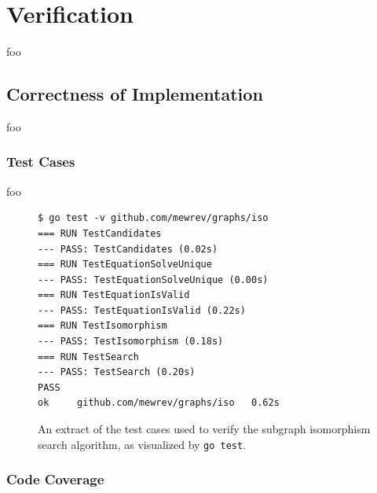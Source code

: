 
\section{Verification}


foo


\subsection{Correctness of Implementation}

foo

\subsubsection{Test Cases}


foo

\begin{figure}[htbp]
	\begin{center}
		\begin{verbatim}
$ go test -v github.com/mewrev/graphs/iso
=== RUN TestCandidates
--- PASS: TestCandidates (0.02s)
=== RUN TestEquationSolveUnique
--- PASS: TestEquationSolveUnique (0.00s)
=== RUN TestEquationIsValid
--- PASS: TestEquationIsValid (0.22s)
=== RUN TestIsomorphism
--- PASS: TestIsomorphism (0.18s)
=== RUN TestSearch
--- PASS: TestSearch (0.20s)
PASS
ok     github.com/mewrev/graphs/iso   0.62s
		\end{verbatim}
		\caption{An extract of the test cases used to verify the subgraph isomorphism search algorithm, as visualized by \texttt{go test}.}
		\label{fig:iso_test_cases}
	\end{center}
\end{figure}

\subsubsection{Code Coverage}

